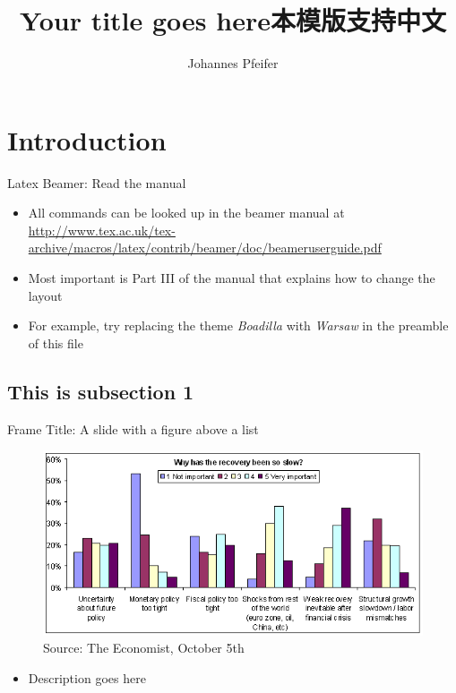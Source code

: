 \documentclass{ctexbeamer}
\title{Your title goes here本模版支持中文}
\date{\zhtoday}
\author{Johannes Pfeifer}
\institute{University of Cologne}
\begin{document}
\begin{frame}
  \titlepage
\end{frame}


\begin{frame}
    \tableofcontents
\end{frame}

\section{Introduction}
\begin{frame}{Latex Beamer: Read the manual}
    \begin{itemize}
        \item All commands can be looked up in the beamer manual at
            \url{http://www.tex.ac.uk/tex-archive/macros/latex/contrib/beamer/doc/beameruserguide.pdf}
        \item Most important is Part III of the manual that explains how to change the layout
        \item For example, try replacing the theme \textit{Boadilla} with \textit{Warsaw} in the preamble of this file
    \end{itemize}
\end{frame}


\subsection{This is subsection 1}
\begin{frame}{Frame Title: A slide with a figure above a list}
    \begin{figure}
        \includegraphics[scale=.3]{why_has_the_recovery_been_so_slow_all_respondents_0}
        \caption{Source: The Economist, October 5th}
    \end{figure}
    \begin{itemize}
        \item Description goes here
    \end{itemize}
\end{frame}
\end{document}
